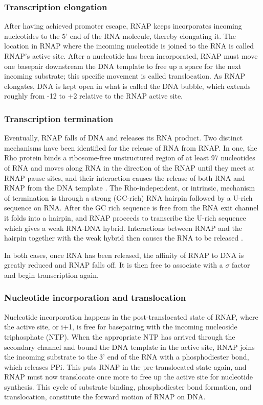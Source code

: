 \subsubsection{Transcription elongation}
After having achieved promoter escape, RNAP keeps incorporates incoming
nucleotides to the 5' end of the RNA molecule, thereby elongating it. The
location in RNAP where the incoming nucleotide is joined to the RNA is
called RNAP's active site. After a nucleotide has been incorporated, RNAP must
move one basepair downstream the DNA template to free up a space for the next
incoming substrate; this specific movement is called translocation. As RNAP
elongates, DNA is kept open in what is called the DNA bubble, which extends
roughly from -12 to +2 relative to the RNAP active site.

\subsubsection{Transcription termination}
Eventually, RNAP falls of DNA and releases its RNA product. Two distinct
mechanisms have been identified for the release of RNA from RNAP. In one, the Rho
protein binds a ribosome-free unstructured region of at least 97 nucleotides of
RNA and moves along RNA in the direction of the RNAP until they meet at RNAP
pause sites, and their interaction causes the release of both RNA and RNAP from
the DNA template \cite{ciampi_rho-dependent_2006}. The
Rho-independent, or intrinsic, mechanism of termination is through a strong
(GC-rich) RNA hairpin followed by a U-rich sequence on RNA. After the GC rich
sequence is free from the RNA exit channel it folds into a hairpin, and
RNAP proceeds to transcribe the U-rich sequence which gives a weak RNA-DNA
hybrid. Interactions between RNAP and the hairpin together with the weak hybrid
then causes the RNA to be released \cite{nudler_transcription_2002}.

In both cases, once RNA has been released, the affinity of RNAP to DNA is
greatly reduced and RNAP falls off. It is then free to associate with a
$\sigma$ factor and begin transcription again.

\subsubsection{Nucleotide incorporation and translocation}
Nucleotide incorporation happens in the post-translocated state of RNAP, where
the active site, or i+1, is free for basepairing with the incoming nucleoside
triphosphate (NTP). When the appropriate NTP has arrived through the secondary
channel and bound the DNA template in the active site, RNAP joins the incoming
substrate to the 3' end of the RNA with a phosphodiester bond, which releases
PPi. This puts RNAP in the pre-translocated state again, and RNAP must now
translocate once more to free up the active site for nucleotide synthesis. This
cycle of substrate binding, phosphodiester bond formation, and translocation,
constitute the forward motion of RNAP on DNA.

